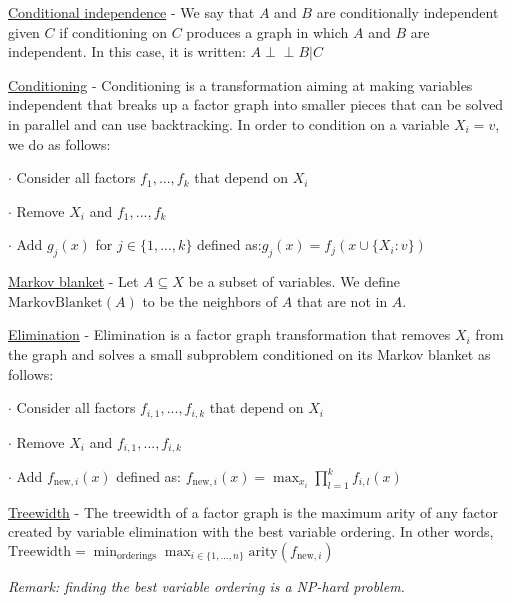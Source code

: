 \documentclass[4pt,landscape]{article}
\begin{document}
\begin{multicols*}{4}
 {\tiny \underline{Conditional independence} - We say that $A$ and $B$ are conditionally independent given $C$ if conditioning on $C$ produces a graph in which $A$ and $B$ are independent. In this case, it is written: $A\perp\!\!\!\!\perp B|C$}\par
 {\tiny \underline{Conditioning} - Conditioning is a transformation aiming at making variables independent that breaks up a factor graph into smaller pieces that can be solved in parallel and can use backtracking. In order to condition on a variable $X_i=v$, we do as follows:}\par
 {\tiny $\cdot$ Consider all factors $f_1,...,f_k$ that depend on $X_i$}\par
 {\tiny $\cdot$ Remove $X_i$ and $f_1,...,f_k$}\par
 {\tiny $\cdot$ Add $g_j(x)$ for $j \in \{1,...,k\}$ defined as:$g_j(x)=f_j(x\cup \{X_i:v\})$}\par
 {\tiny \underline{Markov blanket} - Let $A\subseteq X$ be a subset of variables. We define $\textrm{MarkovBlanket}(A)$ to be the neighbors of $A$ that are not in $A$.}\par
 \par
 \hspace{1cm}{\tiny $A \perp\!\!\!\!\perp B|C$}\par
 {\tiny \underline{Elimination} - Elimination is a factor graph transformation that removes $X_i$ from the graph and solves a small subproblem conditioned on its Markov blanket as follows:}\par
 {\tiny $\cdot$ Consider all factors $f_{i,1},...,f_{i,k}$ that depend on $X_i$}\par
 {\tiny $\cdot$ Remove $X_i$ and $f_{i,1},...,f_{i,k}$}\par
 {\tiny $\cdot$ Add $f_{\textrm{new},i}(x)$ defined as: $f_{\textrm{new},i}(x)=\max_{x_i}\prod_{l=1}^kf_{i,l}(x)$}\par
 {\tiny \underline{Treewidth} - The treewidth of a factor graph is the maximum arity of any factor created by variable elimination with the best variable ordering. In other words, $\textrm{Treewidth} = \min_{\textrm{orderings}} \max_{i\in \{1,...,n\}} \textrm{arity}(f_{\textrm{new},i})$}\par
 {\tiny \textit{Remark: finding the best variable ordering is a NP-hard problem.}}\par

\end{multicols*}
\end{document}
